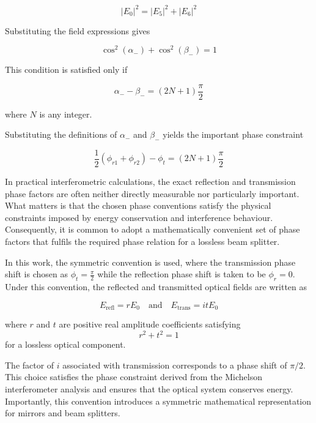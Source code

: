 \documentclass{report}
\begin{document}
\begin{equation}
|E_0|^2
=
|E_5|^2
+
|E_6|^2
\end{equation}

Substituting the field expressions gives

\begin{equation}
\cos^2(\alpha_-)
+
\cos^2(\beta_-)
=
1
\end{equation}

This condition is satisfied only if

\begin{equation}
\alpha_-
-
\beta_-
=
(2N+1)\frac{\pi}{2}
\end{equation}

where $N$ is any integer.

Substituting the definitions of $\alpha_-$ and $\beta_-$ yields the important phase constraint

\begin{equation}
\boxed{\frac{1}{2}
(
\phi_{r1}
+
\phi_{r2}
)
-
\phi_t
=
(2N+1)\frac{\pi}{2}}
\end{equation}

In practical interferometric calculations, the exact reflection and transmission phase factors are often neither directly measurable nor particularly important. What matters is that the chosen phase conventions satisfy the physical constraints imposed by energy conservation and interference behaviour. Consequently, it is common to adopt a mathematically convenient set of phase factors that fulfils the required phase relation for a lossless beam splitter.

In this work, the symmetric convention is used, where the transmission phase shift is chosen as $\phi_t=\frac{\pi}{2}$ while the reflection phase shift is taken to be $\phi_r=0$. Under this convention, the reflected and transmitted optical fields are written as

\begin{equation}
E_{\text{refl}} = rE_0 \quad \text{and} \quad E_{\text{trans}} = itE_0
\end{equation}

where $r$ and $t$ are positive real amplitude coefficients satisfying
\begin{equation}
r^2+t^2=1
\end{equation}
for a lossless optical component.

The factor of $i$ associated with transmission corresponds to a phase shift of $\pi/2$. This choice satisfies the phase constraint derived from the Michelson interferometer analysis and ensures that the optical system conserves energy. Importantly, this convention introduces a symmetric mathematical representation for mirrors and beam splitters.
\end{document}
